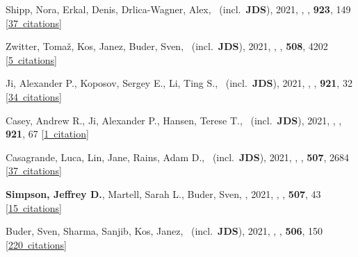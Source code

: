 \item[{\color{numcolor}\scriptsize67}] Shipp, Nora, Erkal, Denis, Drlica-Wagner, Alex, \etal\ (incl.\ \textbf{JDS}), 2021, , \apj, \textbf{923}, 149 [\href{https://ui.adsabs.harvard.edu/#abs/2021ApJ...923..149S}{37~citations}]

\item[{\color{numcolor}\scriptsize66}] Zwitter, Toma{\v{z}}, Kos, Janez, Buder, Sven, \etal\ (incl.\ \textbf{JDS}), 2021, , \mnras, \textbf{508}, 4202 [\href{https://ui.adsabs.harvard.edu/#abs/2021MNRAS.508.4202Z}{5~citations}]

\item[{\color{numcolor}\scriptsize65}] Ji, Alexander P., Koposov, Sergey E., Li, Ting S., \etal\ (incl.\ \textbf{JDS}), 2021, , \apj, \textbf{921}, 32 [\href{https://ui.adsabs.harvard.edu/#abs/2021ApJ...921...32J}{34~citations}]

\item[{\color{numcolor}\scriptsize64}] Casey, Andrew R., Ji, Alexander P., Hansen, Terese T., \etal\ (incl.\ \textbf{JDS}), 2021, , \apj, \textbf{921}, 67 [\href{https://ui.adsabs.harvard.edu/#abs/2021ApJ...921...67C}{1~citation}]

\item[{\color{numcolor}\scriptsize63}] Casagrande, Luca, Lin, Jane, Rains, Adam D., \etal\ (incl.\ \textbf{JDS}), 2021, , \mnras, \textbf{507}, 2684 [\href{https://ui.adsabs.harvard.edu/#abs/2021MNRAS.507.2684C}{37~citations}]

\item[{\color{numcolor}\scriptsize62}] \textbf{Simpson, Jeffrey D.}, Martell, Sarah L., Buder, Sven, \etal, 2021, , \mnras, \textbf{507}, 43 [\href{https://ui.adsabs.harvard.edu/#abs/2021MNRAS.507...43S}{15~citations}]

\item[{\color{numcolor}\scriptsize61}] Buder, Sven, Sharma, Sanjib, Kos, Janez, \etal\ (incl.\ \textbf{JDS}), 2021, , \mnras, \textbf{506}, 150 [\href{https://ui.adsabs.harvard.edu/#abs/2021MNRAS.506..150B}{220~citations}]

